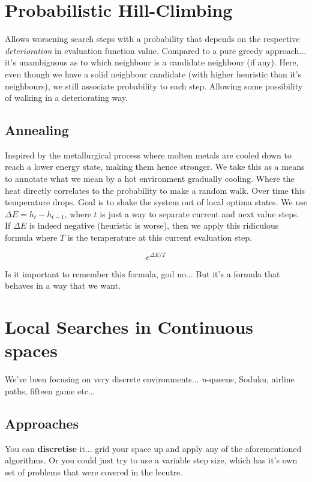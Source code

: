 \documentclass{article}
\begin{document}
\section{Probabilistic Hill-Climbing}
Allows worsening search steps with a probability that depends on the respective \emph{deterioration} in evaluation function value. Compared to a pure greedy approach... it's unambiguous as to which neighbour is a candidate neighbour (if any). Here, even though we have a solid neighbour candidate (with higher heuristic than it's neighbours), we still associate probability to each step. Allowing some possibility of walking in a deteriorating way.

\subsection{Annealing}
Inspired by the metallurgical process where molten metals are cooled down to reach a lower energy state, making them hence stronger. We take this as a means to annotate what we mean by a hot environment gradually cooling. Where the heat directly correlates to the probability to make a random walk. Over time this temperature drops. Goal is to shake the system out of local optima states. We use $\Delta E = h_t - h_{t-1}$, where $t$ is just a way to separate current and next value steps. If $\Delta E$ is indeed negative (heuristic is worse), then we apply this ridiculous formula where $T$ is the temperature at this current evaluation step.

\begin{equation}
	e^{\Delta E/T}
\end{equation}

Is it important to remember this formula, god no... But it's a formula that behaves in a way that we want.

\section*{Local Searches in Continuous spaces}
We've been focusing on very discrete environments... \emph{n}-queens, Soduku, airline paths, fifteen game etc...

\subsection*{Approaches}
You can \textbf{discretise} it... grid your space up and apply any of the aforementioned algorithms. Or you could just try to use a variable step size, which has it's own set of problems that were covered in the lecutre.
\end{document}
